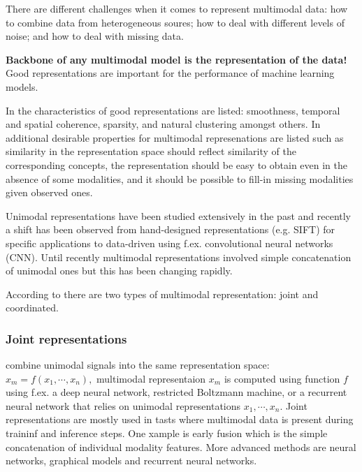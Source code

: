 There are different challenges when it comes to represent multimodal data: how to combine data from heterogeneous soures; how to deal with different levels of noise; and how to deal with missing data. \cite{Baltruvsaitis2017multimodal}

\textbf{Backbone of any multimodal model is the representation of the data!} Good representations are important for the performance of machine learning models.

In \cite{Bengio2013representation} the characteristics of good representations are listed: smoothness, temporal and spatial coherence, sparsity, and natural clustering amongst others. In \cite{Srivastava2012} additional desirable properties for multimodal represenations are listed such as similarity in the representation space should reflect similarity of the corresponding concepts, the representation should be easy to obtain even in the absence of some modalities, and it should be possible to fill-in missing modalities given observed ones.

Unimodal representations have been studied extensively in the past and recently a shift has been observed from hand-designed representations (e.g. SIFT) for specific applications to data-driven using f.ex. convolutional neural networks (CNN). Until recently multimodal representations involved simple concatenation of unimodal ones but this has been changing rapidly.\cite{Baltruvsaitis2017multimodal}

According to \cite{Baltruvsaitis2017multimodal} there are two types of multimodal representation: joint and coordinated. 
\subsubsection{Joint representations} combine unimodal signals into the same representation space:
$x_m = f(x_1, \cdots, x_n),$
multimodal representaion $x_m$ is computed using function $f$ using f.ex. a deep neural network, restricted Boltzmann machine, or a recurrent neural network that relies on unimodal representations $x_1,\cdots, x_n $. 
Joint representations are mostly used in tasts where multimodal data is present during traininf and inference steps. One xample is early fusion which is the simple concatenation of individual modality features. More advanced methods are neural networks, graphical models and recurrent neural networks.

